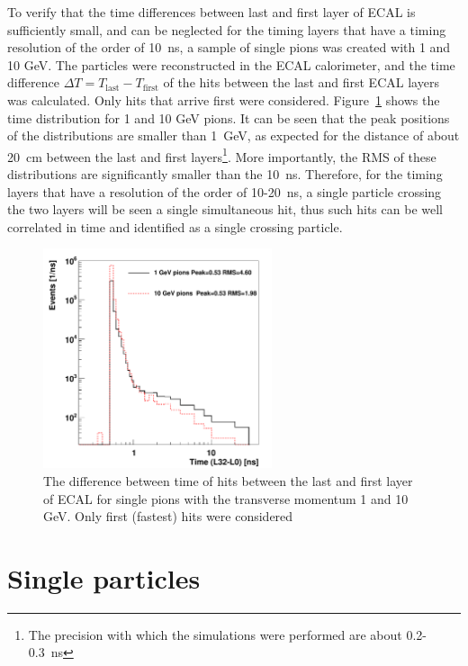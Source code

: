 \documentclass[final,1p,11pt]{elsarticle}
\begin{document}
To verify that the time differences between last and first layer of ECAL is sufficiently small, and can be neglected for the timing layers that
have a timing resolution of the order of 10~ns, a sample of single pions was created with 1 and 10 GeV. The particles were reconstructed in the ECAL calorimeter,
and the time difference $\Delta T= T_{\mathrm{last}}-T_{\mathrm{first}}$ of the hits between the last and first ECAL layers was calculated.
Only hits that arrive first were considered.
Figure~\ref{fig:timediff} shows the time distribution for 1 and 10 GeV pions. It can be seen that the peak positions of the distributions are smaller
than 1~GeV, as expected for the distance of about 20~cm between  the last and first layers\footnote{The precision with which the simulations were performed are about 0.2-0.3~ns}. More importantly, the RMS of these distributions are significantly smaller than the 10~ns. 
Therefore, for the timing layers that have a resolution of the order of 10-20~ns, a single particle crossing the two layers  will be seen a single simultaneous hit,
thus such hits can be well correlated in time and identified as a single crossing particle.
 

\begin{figure}
\begin{center}
   \includegraphics[width=0.6\textwidth]{timeECAL_2layers1.pdf}\hfill
\end{center}
\caption{The difference between time of hits between the last and first layer of ECAL for single pions with the transverse momentum 1 and 10 GeV. 
Only first (fastest) hits were considered}
\label{fig:timediff}
\end{figure}





\clearpage
\section{Single particles} 
\end{document}
